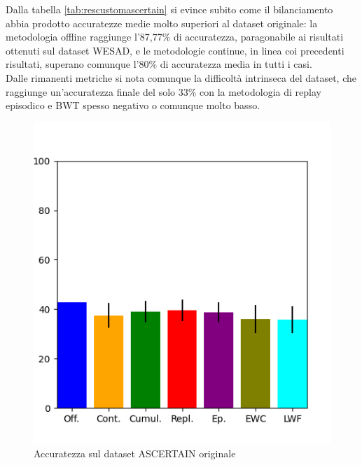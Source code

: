 Dalla tabella \ref{tab:rescustomascertain} si evince subito come il bilanciamento abbia prodotto accuratezze medie molto superiori al dataset originale: la metodologia offline raggiunge l'87,77\% di accuratezza, paragonabile ai risultati ottenuti sul dataset WESAD, e le metodologie continue, in linea coi precedenti risultati, superano comunque l'80\% di accuratezza media in tutti i casi.\\
Dalle rimanenti metriche si nota comunque la difficoltà intrinseca del dataset, che raggiunge un'accuratezza finale del solo 33\% con la metodologia di replay episodico e BWT spesso negativo o comunque molto basso.
\begin{figure}[!tbp]
    \begin{minipage}[b]{0.5\textwidth}
		\includegraphics[width=\textwidth]{img/graphs/ascertain_final_accuracy.png}
		\caption{Accuratezza sul dataset ASCERTAIN originale}
		\label{fig:ascertain_accuracy_graph}
	\end{minipage}
    \hfill
    \begin{minipage}[b]{0.5\textwidth}

\end{minipage}
\end{figure}

